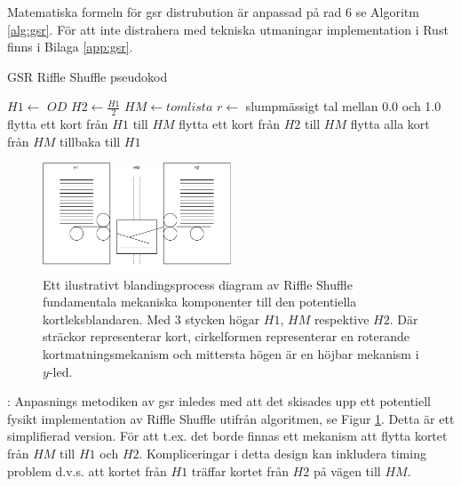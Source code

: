 \documentclass[swedish,a4paper]{article}
\begin{document}
Matematiska formeln för \gls{gsr} distrubution är anpassad på rad 6 se Algoritm
\ref{alg:gsr}. För att inte distrahera med tekniska utmaningar implementation i
Rust finns i Bilaga \ref{app:gsr}.
\begin{algorithm}
\caption{GSR Riffle Shuffle pseudokod}
\label{alg:gsr}
\begin{algorithmic}[1]
\State $H1 \gets$ $OD$ 
\State $H2 \gets \frac{H1}{2}$ 
\State $HM \gets tom lista$ 
\State $r \gets$ slumpmässigt tal mellan 0.0 och 1.0 
        \State flytta ett kort från $H1$ till $HM$
    \Else
        \State flytta ett kort från $H2$ till $HM$
    \EndIf
\EndWhile
\State flytta alla kort från $HM$ tillbaka till $H1$
\end{algorithmic}
\end{algorithm}
\begin{figure}[H]
	\centering
	\includegraphics[width=0.5\textwidth]{irl_riffle_shuffle.pdf}
	\captionsetup{width=0.5\textwidth}
	\caption{Ett ilustrativt blandingsprocess
		diagram av
	Riffle Shuffle fundamentala mekaniska komponenter till den potentiella
	kortleksblandaren. Med 3 stycken högar $H1$, $HM$ respektive $H2$. Där sträckor representerar kort,
	cirkelformen representerar en roterande kortmatningsmekanism och mittersta
	högen är en höjbar mekanism i $y$-led.}
	\label{fig:irl_gsr}
\end{figure}

: Anpasnings metodiken av
\gls{gsr} inledes med att det skisades upp ett potentiell fysikt implementation av
Riffle Shuffle utifrån algoritmen, se Figur \ref{fig:irl_gsr}. Detta är ett
simplifierad version. För att t.ex. det borde finnas ett mekanism att flytta
kortet från $HM$ till $H1$ och $H2$. Kompliceringar i detta design kan inkludera
timing problem d.v.s. att kortet från $H1$ träffar kortet från $H2$ på vägen
till $HM$.
\end{document}
